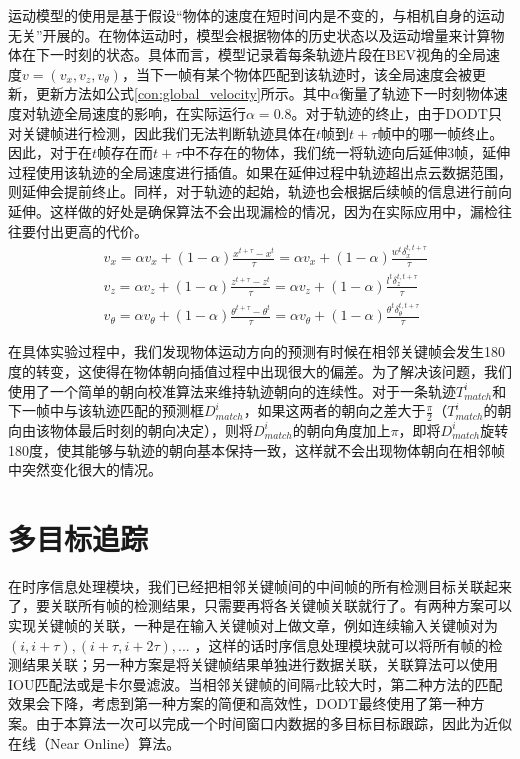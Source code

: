 运动模型的使用是基于假设“物体的速度在短时间内是不变的，与相机自身的运动无关”开展的。在物体运动时，模型会根据物体的历史状态以及运动增量来计算物体在下一时刻的状态。具体而言，模型记录着每条轨迹片段在BEV视角的全局速度$v = (v_x, v_z, v_{\theta})$，当下一帧有某个物体匹配到该轨迹时，该全局速度会被更新，更新方法如公式\ref{con:global_velocity}所示。其中$\alpha$衡量了轨迹下一时刻物体速度对轨迹全局速度的影响，在实际运行$\alpha = 0.8$。对于轨迹的终止，由于DODT只对关键帧进行检测，因此我们无法判断轨迹具体在$t$帧到$t+\tau$帧中的哪一帧终止。因此，对于在$t$帧存在而$t+\tau$中不存在的物体，我们统一将轨迹向后延伸3帧，延伸过程使用该轨迹的全局速度进行插值。如果在延伸过程中轨迹超出点云数据范围，则延伸会提前终止。同样，对于轨迹的起始，轨迹也会根据后续帧的信息进行前向延伸。这样做的好处是确保算法不会出现漏检的情况，因为在实际应用中，漏检往往要付出更高的代价。
\begin{equation}
\begin{aligned}
	& v_x = \alpha v_x + (1-\alpha)\frac{x^{t+\tau} - x^{t}}{\tau} = \alpha v_x + (1-\alpha)\frac{w^t \delta_x^{t,t+\tau}}{\tau}\\
	& v_z = \alpha v_z + (1-\alpha)\frac{z^{t+\tau} - z^{t}}{\tau} = \alpha v_z + (1-\alpha)\frac{l^t \delta_z^{t,t+\tau}}{\tau}\\
	& v_{\theta} = \alpha v_{\theta} + (1-\alpha)\frac{\theta^{t+\tau} - \theta^{t}}{\tau} = \alpha v_{\theta} + (1-\alpha)\frac{\theta^t \delta_{\theta}^{t,t+\tau}}{\tau}
\end{aligned}
\label{con:global_velocity}
\end{equation}

在具体实验过程中，我们发现物体运动方向的预测有时候在相邻关键帧会发生180度的转变，这使得在物体朝向插值过程中出现很大的偏差。为了解决该问题，我们使用了一个简单的朝向校准算法来维持轨迹朝向的连续性。对于一条轨迹$T^i_{match}$和下一帧中与该轨迹匹配的预测框$D^i_{match}$，如果这两者的朝向之差大于$\frac{\pi}{2}$（$T^i_{match}$的朝向由该物体最后时刻的朝向决定），则将$D^i_{match}$的朝向角度加上$\pi$，即将$D^i_{match}$旋转180度，使其能够与轨迹的朝向基本保持一致，这样就不会出现物体朝向在相邻帧中突然变化很大的情况。

\section{多目标追踪}
\label{tracking_module}
在时序信息处理模块，我们已经把相邻关键帧间的中间帧的所有检测目标关联起来了，要关联所有帧的检测结果，只需要再将各关键帧关联就行了。有两种方案可以实现关键帧的关联，一种是在输入关键帧对上做文章，例如连续输入关键帧对为$(i, i+\tau), (i+\tau, i+2\tau), ...$ ，这样的话时序信息处理模块就可以将所有帧的检测结果关联；另一种方案是将关键帧结果单独进行数据关联，关联算法可以使用IOU匹配法或是卡尔曼滤波。当相邻关键帧的间隔$\tau$比较大时，第二种方法的匹配效果会下降，考虑到第一种方案的简便和高效性，DODT最终使用了第一种方案。由于本算法一次可以完成一个时间窗口内数据的多目标目标跟踪，因此为近似在线（Near Online）算法。

